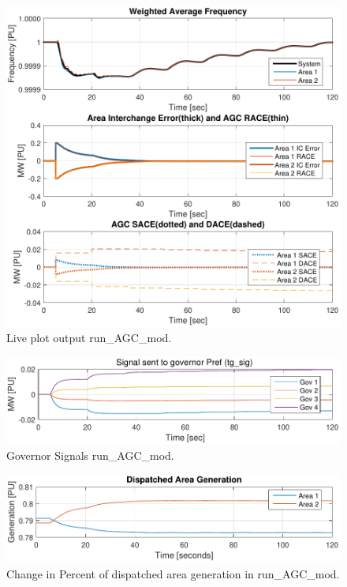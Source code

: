 \begin{figure}[H]
	\centering
	\footnotesize
	\includegraphics[width=\linewidth]{examples/agcMod/agcSigs}
	\caption{Live plot output run\_AGC\_mod.}
	\label{fig: AGCmod liveplot}
\end{figure}%

\begin{figure}[H]
	\centering
	\footnotesize
	\includegraphics[width=\linewidth]{examples/agcMod/tgSigs}
	\caption{Governor Signals run\_AGC\_mod.}
	\label{fig: AGCmod tg sig}
\end{figure}%

\begin{figure}[H]
	\centering
	\footnotesize
	\includegraphics[width=\linewidth]{examples/agcMod/areaGen}
	\caption{Change in Percent of dispatched area generation in run\_AGC\_mod.}
	\label{fig: AGCmod area gen}
\end{figure}%


